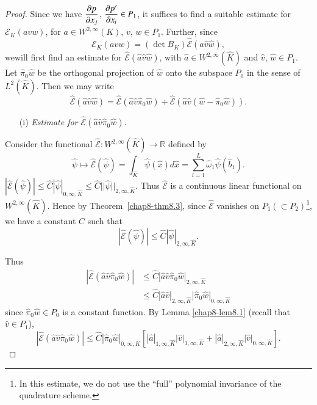 \begin{proof}
Since we have $\dfrac{\partial p}{\partial x_{j}}$, $\dfrac{\partial p'}{\partial x_{i}}\in
P_{1}$, it suffices to find a suitable estimate for
$\mathscr{E}_{K}(avw)$, for $a\in W^{2,\infty}(K)$, $v$, $w\in
P_{1}$. Further, since
\begin{equation*}
\mathscr{E}_{K}(avw)=(\det
B_{K})\hat{\mathscr{E}}(\hat{a}\hat{v}\hat{w}),\tag{8.34}\label{chap8-eq8.34} 
\end{equation*}
we\pageoriginale will first find an estimate for
$\hat{\mathscr{E}}(\hat{a}\hat{v}\hat{w})$, with $\hat{a}\in
W^{2,\infty}(\hat{K})$ and $\hat{v}$, $\hat{w}\in P_{1}$. Let
$\hat{\pi}_{0}\hat{w}$ be the orthogonal projection of $\hat{w}$ onto
the subspace $P_{0}$ in the sense of $L^{2}(\hat{K})$. Then we may
write
\begin{equation*}
\hat{\mathscr{E}}(\hat{a}\hat{v}\hat{w})=\hat{\mathscr{E}}(\hat{a}\hat{v}\hat{\pi}_{0}\hat{w})+\hat{\mathscr{E}}(\hat{a}\hat{v}(\hat{w}-\hat{\pi}_{0}\hat{w})).\tag{8.35}\label{chap8-eq8.35}  
\end{equation*}
\begin{itemize}
\item[(i)] {\em Estimate for
  $\hat{\mathscr{E}}(\hat{a}\hat{v}\hat{\pi}_{0}\hat{w})$.}
\end{itemize}

Consider the functional $\hat{\mathscr{E}}:W^{2,\infty}(\hat{K})\to
\mathbb{R}$ defined by
$$
\hat{\psi}\mapsto 
\hat{\mathscr{E}}(\hat{\psi})=\int_{\hat{K}}\hat{\psi}(\hat{x})d\hat{x}=\sum^{L}_{l=1}\hat{\omega}_{1}\hat{\psi}(\hat{b}_{1}). 
$$
 $|\hat{\mathscr{E}}(\hat{\psi})|\leq
\hat{C}|\hat{\psi}|_{0,\infty,\hat{K}}\leq
\hat{C}||\hat{\psi}||_{2,\infty,\hat{K}}$. Thus $\hat{\mathscr{E}}$ is
a continuous linear functional on $W^{2,\infty}(\hat{K})$. Hence by
Theorem~\ref{chap8-thm8.3}, since $\hat{\mathscr{E}}$ vanishes on
$P_{1}(\subset P_{2})$\footnote[1]{In this estimate, we do not use the
``full'' polynomial invariance of the quadrature scheme.}, we have a
constant $\hat{C}$ such that
\begin{equation*}
|\hat{\mathscr{E}}(\hat{\psi})|\leq
\hat{C}|\hat{\psi}|_{2,\infty,\hat{K}}.\tag{8.36}\label{chap8-eq8.36} 
\end{equation*}

Thus
\begin{align*}
|\hat{\mathscr{E}}(\hat{a}\hat{v}\hat{\pi}_{0}\hat{w})| &\leq
\hat{C}|\hat{a}\hat{v}\hat{\pi}_{0}\hat{w}|_{2,\infty,\hat{K}}\\
&\leq
\hat{C}|\hat{a}\hat{v}|_{2,\infty,\hat{K}}|\hat{\pi}_{0}\hat{w}|_{0,\infty,\hat{K}} 
\end{align*}
since $\hat{\pi}_{0}\hat{w}\in P_{0}$ is a constant function. By Lemma
\ref{chap8-lem8.1} (recall that $\hat{v}\in P_{1}$),
$$
|\hat{\mathscr{E}}(\hat{a}\hat{v}\hat{\pi}_{0}\hat{w})|\leq
\hat{C}|\hat{\pi}_{0}\hat{w}|_{0,\infty,\hat{K}}\left[|\hat{a}|_{1,\infty,\hat{K}}|\hat{v}|_{1,\infty,\hat{K}}+|\hat{a}|_{2,\infty,\hat{K}}|\hat{v}|_{0,\infty,\hat{K}}\right]. 
$$


\end{proof}
